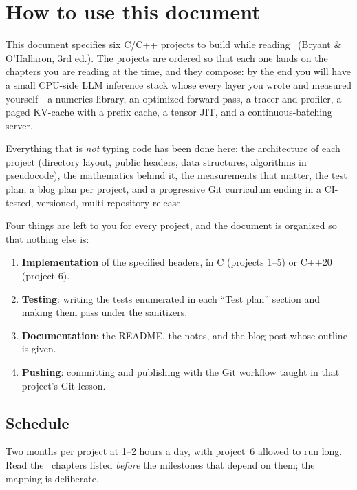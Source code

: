 \chapter*{How to use this document}

This document specifies six C/C++ projects to build while reading \csapp\ (Bryant \& O'Hallaron, 3rd ed.). The projects are ordered so that each one lands on the chapters you are reading at the time, and they compose: by the end you will have a small CPU-side LLM inference stack whose every layer you wrote and measured yourself---a numerics library, an optimized forward pass, a tracer and profiler, a paged KV-cache with a prefix cache, a tensor JIT, and a continuous-batching server.

Everything that is \emph{not} typing code has been done here: the architecture of each project (directory layout, public headers, data structures, algorithms in pseudocode), the mathematics behind it, the measurements that matter, the test plan, a blog plan per project, and a progressive Git curriculum ending in a CI-tested, versioned, multi-repository release.

\begin{leftto}
Four things are left to you for every project, and the document is organized so that nothing else is:
\begin{enumerate}
  \item \textbf{Implementation} of the specified headers, in C (projects 1--5) or C++20 (project 6).
  \item \textbf{Testing}: writing the tests enumerated in each ``Test plan'' section and making them pass under the sanitizers.
  \item \textbf{Documentation}: the README, the  notes, and the blog post whose outline is given.
  \item \textbf{Pushing}: committing and publishing with the Git workflow taught in that project's Git lesson.
\end{enumerate}
\end{leftto}

\section*{Schedule}

Two months per project at 1--2 hours a day, with project~6 allowed to run long. Read the \csapp\ chapters listed \emph{before} the milestones that depend on them; the mapping is deliberate.

